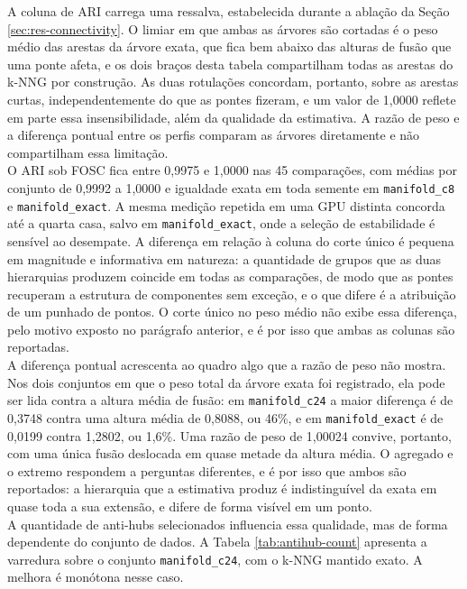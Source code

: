 A coluna de \ac{ARI} carrega uma ressalva, estabelecida durante a ablação da Seção \ref{sec:res-connectivity}. O limiar em que ambas as árvores são cortadas é o peso médio das arestas da árvore exata, que fica bem abaixo das alturas de fusão que uma ponte afeta, e os dois braços desta tabela compartilham todas as arestas do \ac{k-NNG} por construção. As duas rotulações concordam, portanto, sobre as arestas curtas, independentemente do que as pontes fizeram, e um valor de 1,0000 reflete em parte essa insensibilidade, além da qualidade da estimativa. A razão de peso e a diferença pontual entre os perfis comparam as árvores diretamente e não compartilham essa limitação.\\

O \ac{ARI} sob \ac{FOSC} fica entre 0,9975 e 1,0000 nas 45 comparações, com médias por conjunto de 0,9992 a 1,0000 e igualdade exata em toda semente em \texttt{manifold\_c8} e \texttt{manifold\_exact}. A mesma medição repetida em uma \ac{GPU} distinta concorda até a quarta casa, salvo em \texttt{manifold\_exact}, onde a seleção de estabilidade é sensível ao desempate. A diferença em relação à coluna do corte único é pequena em magnitude e informativa em natureza: a quantidade de grupos que as duas hierarquias produzem coincide em todas as comparações, de modo que as pontes recuperam a estrutura de componentes sem exceção, e o que difere é a atribuição de um punhado de pontos. O corte único no peso médio não exibe essa diferença, pelo motivo exposto no parágrafo anterior, e é por isso que ambas as colunas são reportadas.\\

A diferença pontual acrescenta ao quadro algo que a razão de peso não mostra. Nos dois conjuntos em que o peso total da árvore exata foi registrado, ela pode ser lida contra a altura média de fusão: em \texttt{manifold\_c24} a maior diferença é de 0,3748 contra uma altura média de 0,8088, ou 46\%, e em \texttt{manifold\_exact} é de 0,0199 contra 1,2802, ou 1,6\%. Uma razão de peso de 1,00024 convive, portanto, com uma única fusão deslocada em quase metade da altura média. O agregado e o extremo respondem a perguntas diferentes, e é por isso que ambos são reportados: a hierarquia que a estimativa produz é indistinguível da exata em quase toda a sua extensão, e difere de forma visível em um ponto.\\

A quantidade de anti-hubs selecionados influencia essa qualidade, mas de forma dependente do conjunto de dados. A Tabela \ref{tab:antihub-count} apresenta a varredura sobre o conjunto \texttt{manifold\_c24}, com o \ac{k-NNG} mantido exato. A melhora é monótona nesse caso.\\

